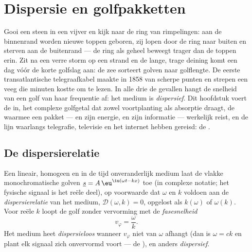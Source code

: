 \chapter{Dispersie en golfpakketten}\label{ch:b2:dispersion-wave-packets}

Gooi een steen in een vijver en kijk naar de ring van rimpelingen: aan de
binnenrand worden nieuwe toppen geboren, zij lopen door de ring naar buiten
en sterven aan de buitenrand --- de ring als geheel beweegt trager dan de
toppen erin. Zit na een verre storm op een strand en de lange, trage deining
komt een dag vóór de korte golfslag aan: de zee sorteert golven naar
golflengte. De eerste transatlantische telegraafkabel maakte in 1858 van
scherpe punten en strepen een veeg die minuten kostte om te lezen. In alle
drie de gevallen hangt de snelheid van een golf van haar frequentie af: het
medium is \emph{dispersief}. Dit hoofdstuk voert de  in, het
complexe golfgetal dat zowel voortplanting als absorptie draagt, de
 waarmee een pakket --- en zijn energie, en zijn informatie
--- werkelijk reist, en de lijn waarlangs telegrafie, televisie en het
internet hebben gereisd: de .

\section{De dispersierelatie}

\begin{definition}\label{def:b2:dispersion-wave-packets:relation}
Een lineair, homogeen en in de tijd onveranderlijk medium laat de vlakke
monochromatische golven $\underline s = A\,\eu^{\iu(\omega t - kx)}$ toe (in
complexe notatie; het fysische signaal is het reële deel), op voorwaarde dat
$\omega$ en $k$ voldoen aan de \emph{dispersierelatie} van het medium,
$\mathcal D(\omega, k)
= 0$, opgelost als $k(\omega)$ of $\omega(k)$. Voor
reële $k$ loopt de golf zonder vervorming met de \emph{fasesnelheid}
\[
v_\varphi = \frac\omega k .
\]
Het medium heet \emph{dispersieloos} wanneer $v_\varphi$ niet van $\omega$
afhangt (dan is $\omega = ck$ en plant elk signaal zich onvervormd voort ---
de ), en anders \emph{dispersief}.
\end{definition}

